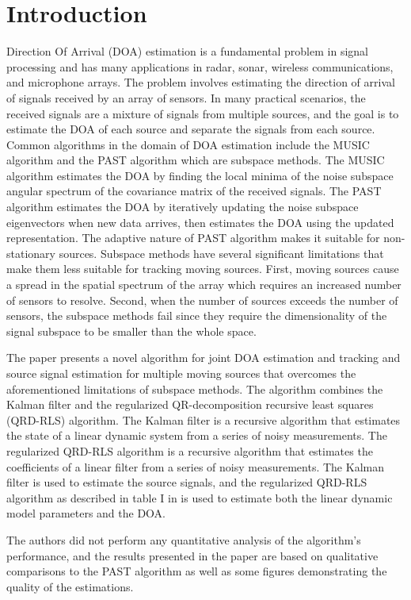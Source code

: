 \documentclass{article}
\begin{document}
 \section{Introduction}

Direction Of Arrival (DOA) estimation is a fundamental problem in signal processing and has many applications in radar, sonar, wireless communications, and microphone arrays.
The problem involves estimating the direction of arrival of signals received by an array of sensors.
In many practical scenarios, the received signals are a mixture of signals from multiple sources, and the goal is to estimate the DOA of each source and separate the signals from each source.
Common algorithms in the domain of DOA estimation include the MUSIC algorithm and the PAST algorithm \cite{PAST} which are subspace methods.
The MUSIC algorithm estimates the DOA by finding the local minima of the noise subspace angular spectrum of the covariance matrix of the received signals.
The PAST algorithm estimates the DOA by iteratively updating the noise subspace eigenvectors when new data arrives, then estimates the DOA using the updated representation.
The adaptive nature of PAST algorithm makes it suitable for non-stationary sources.
Subspace methods have several significant limitations that make them less suitable for tracking moving sources.
First, moving sources cause a spread in the spatial spectrum of the array which requires an increased number of sensors to resolve.
Second, when the number of sources exceeds the number of sensors, the subspace methods fail since they require the dimensionality of the signal subspace to be smaller than the whole space.

The paper presents a novel algorithm for joint DOA estimation and tracking and source signal estimation for multiple moving sources that overcomes the aforementioned limitations of subspace methods.
The algorithm combines the Kalman filter and the regularized QR-decomposition recursive least squares (QRD-RLS) algorithm.
The Kalman filter is a recursive algorithm that estimates the state of a linear dynamic system from a series of noisy measurements.
The regularized QRD-RLS algorithm is a recursive algorithm that estimates the coefficients of a linear filter from a series of noisy measurements.
The Kalman filter is used to estimate the source signals, and the regularized QRD-RLS algorithm as described in table I in \cite{RQRD_RLS_ALG} is used to estimate both the linear dynamic model parameters and the DOA.

The authors did not perform any quantitative analysis of the algorithm's performance, and the results presented in the paper are based on qualitative comparisons to the PAST algorithm 
as well as some figures demonstrating the quality of the estimations.
\end{document}

